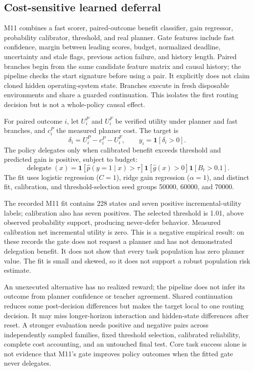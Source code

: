 \subsection{Cost-sensitive learned deferral}\label{sec:method-m11}
M11 combines a fast scorer, paired-outcome benefit classifier, gain regressor, probability calibrator, threshold, and real planner. Gate features include fast confidence, margin between leading scores, budget, normalized deadline, uncertainty and stale flags, previous action failure, and history length. Paired branches begin from the same candidate feature matrix and causal history; the pipeline checks the start signature before using a pair. It explicitly does not claim cloned hidden operating-system state. Branches execute in fresh disposable environments and share a guarded continuation. This isolates the first routing decision but is not a whole-policy causal effect.

For paired outcome $i$, let $U_i^P$ and $U_i^F$ be verified utility under planner and fast branches, and $c_i^P$ the measured planner cost. The target is
\begin{equation}
\delta_i=U_i^P-c_i^P-U_i^F,\qquad y_i=\mathbf{1}[\delta_i>0].
\end{equation}
The policy delegates only when calibrated benefit exceeds threshold and predicted gain is positive, subject to budget:
\begin{equation}
\operatorname{delegate}(x)=\mathbf{1}[\hat p(y=1\mid x)>\tau]
\mathbf{1}[\hat g(x)>0]\mathbf{1}[B_t>0.1].
\end{equation}
The fit uses logistic regression ($C=1$), ridge gain regression ($\alpha=1$), and distinct fit, calibration, and threshold-selection seed groups 50000, 60000, and 70000.

The recorded M11 fit contains 228 states and seven positive incremental-utility labels; calibration also has seven positives. The selected threshold is 1.01, above observed probability support, producing never-defer behavior. Measured calibration net incremental utility is zero. This is a negative empirical result: on these records the gate does not request a planner and has not demonstrated delegation benefit. It does not show that every task population has zero planner value. The fit is small and skewed, so it does not support a robust population risk estimate.

An unexecuted alternative has no realized reward; the pipeline does not infer its outcome from planner confidence or teacher agreement. Shared continuation reduces some post-decision differences but makes the target local to one routing decision. It may miss longer-horizon interaction and hidden-state differences after reset. A stronger evaluation needs positive and negative pairs across independently sampled families, fixed threshold selection, calibrated reliability, complete cost accounting, and an untouched final test. Core task success alone is not evidence that M11's gate improves policy outcomes when the fitted gate never delegates.



